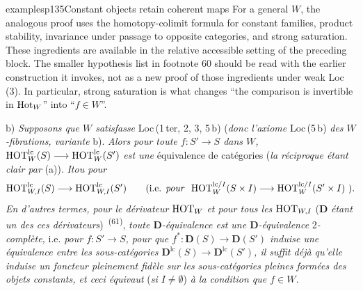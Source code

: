 \begin{dcomment}{examples}{p135}{Constant objects retain coherent maps}
For a general $W$, the analogous proof uses the homotopy-colimit formula for constant families, product stability, invariance under passage to opposite categories, and strong saturation. These ingredients are available in the relative accessible setting of the preceding block. The smaller hypothesis list in footnote 60 should be read with the earlier construction it invokes, not as a new proof of those ingredients under weak Loc\,(3). In particular, strong saturation is what changes ``the comparison is invertible in $\mathrm{Hot}_W$'' into ``$f\in W$''.
\end{dcomment}


b) \textit{Supposons que $W$ satisfasse} Loc\,(1\,ter, 2, 3, 5\,b) (\textit{donc l'axiome} Loc\,(5\,b) \textit{des $W$-fibrations, variante} b). \textit{Alors pour toute $f : S' \longrightarrow S$ dans $W$,} $\mathrm{HOT}^{\mathrm{lc}}_W(S) \longrightarrow \mathrm{HOT}^{\mathrm{lc}}_W(S')$ \textit{est une} équivalence de catégories (\textit{la réciproque étant clair par} (a)). \textit{Itou pour} %
\[
\mathrm{HOT}^{\mathrm{lc}}_{W,I}(S) \longrightarrow \mathrm{HOT}^{\mathrm{lc}}_{W,I}(S') \qquad (\text{i.e. \textit{pour}}\ \ \mathrm{HOT}^{\mathrm{lc}/I}_W(S \times I) \longrightarrow \mathrm{HOT}^{\mathrm{lc}/I}_W(S' \times I)\ ).
\]
\textit{En d'autres termes, pour le dérivateur} $\mathrm{HOT}_W$ \textit{et pour tous les} $\mathrm{HOT}_{W,I}$ ($\mathbf{D}$ \textit{étant un des ces dérivateurs})~\textsuperscript{(61)}, \textit{toute $\mathbf{D}$-équivalence est une $\mathbf{D}$-équivalence} 2\textit{-complète,} i.e. \textit{pour $f : S' \longrightarrow S$, pour que $f^* : \mathbf{D}(S) \longrightarrow \mathbf{D}(S')$ induise une équivalence entre les sous-catégories $\mathbf{D}^{\mathrm{lc}}(S) \longrightarrow \mathbf{D}^{\mathrm{lc}}(S')$, il suffit déjà qu'elle induise un foncteur pleinement fidèle sur les sous-catégories pleines formées des objets constants, et ceci équivaut} (\textit{si $I \neq \emptyset$}) \textit{à la condition que $f \in W$.} %


